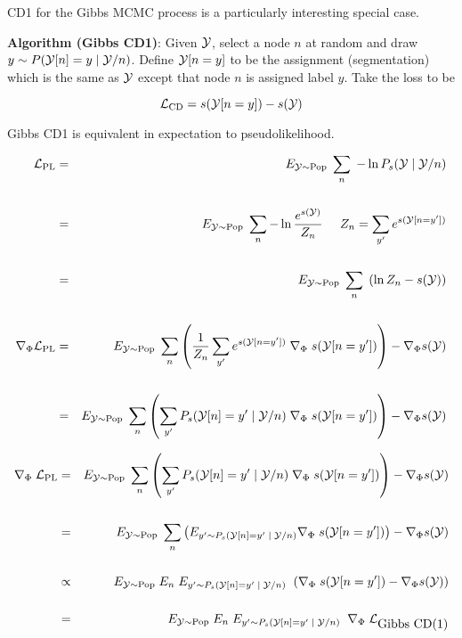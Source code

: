 {CD1 for the Gibbs MCMC process is a particularly interesting special case.

\vfill
{\bf Algorithm (Gibbs CD1)}: Given ${\cal Y}$, select a node $n$ at random and draw {\color{red} $y \sim P({\cal Y}[n]=y\;| \;{\cal Y}/n)$}. Define {\color{red} ${\cal Y}[n=y]$}
to be the assignment (segmentation) which is the same as ${\cal Y}$ except that node $n$ is assigned label $y$.  Take the loss to be

\vfill
{\color{red} $${\cal L}_{\mathrm{CD}}  = s({\cal Y}[n=y]) - s({\cal Y})$$}


Gibbs CD1 is equivalent in expectation to pseudolikelihood.

{\huge
\begin{eqnarray*}
{\cal L}_{\mathrm{PL}} & = & E_{{\cal Y} \sim \mathrm{Pop}}\;\sum_n \; - \ln P_s({\cal Y}\;|\;{\cal Y}/n) \\
\\
 & = & E_{{\cal Y} \sim \mathrm{Pop}}\;\sum_n -\ln \frac{e^{s({\cal Y})}}{Z_n}\;\;\;\;\;{Z_n = \sum_{y'} e^{s({\cal Y}[n=y'])}} \\
\\
& = & E_{{\cal Y} \sim \mathrm{Pop}}\;\sum_n\; \left(\ln Z_n - s({\cal Y})\right) \\
\\
\nabla_\Phi {\cal L}_{\mathrm{PL}} & = & E_{{\cal Y} \sim \mathrm{Pop}}\;\sum_n \left(\frac{1}{Z_n} \sum_{y'} e^{s({\cal Y}[n=y'])} \; \nabla_\Phi\;s({\cal Y}[n=y'])\right) - \nabla_\Phi s({\cal Y}) \\
\\
& = & E_{{\cal Y} \sim \mathrm{Pop}}\;\sum_n \left(\sum_{y'} P_s({\cal Y}[n]=y'\;|\;{\cal Y}/n) \; \nabla_\Phi\;s({\cal Y}[n=y'])\right) - \nabla_\Phi s({\cal Y})
\end{eqnarray*}
}


{\huge
\begin{eqnarray*}
\nabla_\Phi\;{\cal L}_{\mathrm{PL}} & = & E_{{\cal Y} \sim \mathrm{Pop}}\;\sum_n \left(\sum_{y'} P_s({\cal Y}[n]=y'\;|\;{\cal Y}/n)\; \nabla_\Phi\;s({\cal Y}[n=y'])\right) - \nabla_\Phi s({\cal Y}) \\
\\
& = & E_{{\cal Y} \sim \mathrm{Pop}}\;\sum_n \left(E_{y' \sim P_s({\cal Y}[n]=y'\;|\;{\cal Y}/n)} \nabla_\Phi\;s({\cal Y}[n=y'])\right) - \nabla_\Phi s({\cal Y}) \\
\\
& \propto & E_{{\cal Y} \sim \mathrm{Pop}}\;E_n\;  E_{y' \sim P_s({\cal Y}[n]=y'\;|\;{\cal Y}/n)}\;\; (\nabla_\Phi\;s({\cal Y}[n=y']) - \nabla_\Phi s({\cal Y})) \\
\\
& = & E_{{\cal Y} \sim \mathrm{Pop}}\;E_n\; E_{y' \sim P_s({\cal Y}[n]=y'\;|\;{\cal Y}/n)}\;\; \nabla_\Phi\;{\cal L}_{\mbox{Gibbs CD(1)}}
\end{eqnarray*}
}

}

